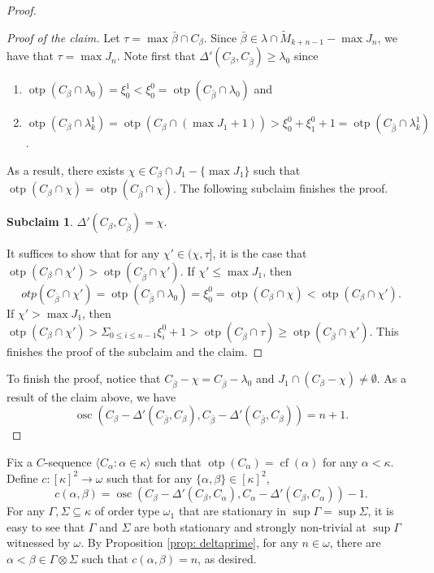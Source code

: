 \documentclass[12pt]{amsart}
\theoremstyle{definition}
\newtheorem{subclaim}[definition]{Subclaim}
\theoremstyle{plain}
\theoremstyle{plain}
\DeclareMathOperator{\cf}{cf}
\DeclareMathOperator{\otp}{otp}
\DeclareMathOperator{\osc}{osc}
\begin{document}
\begin{proof}
	\begin{proof}[Proof of the claim]
	Let $\tau = \max \bar{\beta}\cap C_\beta$. Since $\bar{\beta}\in \lambda\cap \tilde{M}_{k+n-1}-\max J_n$, we have that $\tau = \max J_n$.
	Note first that $\Delta'(C_{\beta}, C_{\bar{\beta}})\geq \lambda_0$ since
		\begin{enumerate}
		\item $\otp(C_\beta\cap \lambda_0) = \xi^1_0 < \xi^0_0 =\otp(C_{\bar{\beta}}\cap \lambda_0)$ and 
		\item $\otp(C_\beta\cap \lambda_k^1) = \otp(C_\beta\cap (\max J_1+1))> \xi^0_0 + \xi^0_1 +1 = \otp(C_{\bar{\beta}}\cap \lambda_k^1)$.
		\end{enumerate}
As a result, there exists $\chi\in C_\beta\cap J_1-\{\max J_1\}$ such that $\otp(C_{\beta}\cap \chi)=\otp(C_{\bar{\beta}}\cap \chi)$. The following subclaim finishes the proof.

	\begin{subclaim}
	$\Delta'(C_{\beta},C_{\bar{\beta}})=\chi$.
	\end{subclaim}
It suffices to show that for any $\chi'\in (\chi, \tau]$, it is the case that $\otp(C_\beta\cap \chi')>\otp(C_{\bar{\beta}}\cap \chi')$. If $\chi'\leq \max J_1$, then $$otp(C_{\bar{\beta}}\cap \chi')=\otp(C_{\bar{\beta}}\cap \lambda_0)=\xi^0_0 = \otp(C_{\beta}\cap \chi)<\otp(C_{\beta}\cap \chi').$$ If $\chi'>\max J_1$, then $\otp(C_\beta\cap \chi')>\Sigma_{0\leq i\leq n-1} \xi^0_{i}+1 > \otp(C_{\bar{\beta}}\cap \tau)\geq \otp(C_{\bar{\beta}}\cap \chi')$. This finishes the proof of the subclaim and the claim.
	\end{proof}
To finish the proof, notice that $C_{\bar{\beta}}-\chi = C_{\bar{\beta}}-\lambda_0$ and $J_1\cap (C_{\beta}-\chi)\neq \emptyset$. As a result of the claim above, we have $$\osc(C_{\beta}-\Delta'(C_{\bar{\beta}}, C_{\beta}),C_{\bar{\beta}}-\Delta'(C_{\bar{\beta}}, C_{\beta}))=n+1.$$
\end{proof} 
	
	
Fix a $C$-sequence $\langle C_\alpha: \alpha\in \kappa\rangle$ such that $\otp(C_\alpha)=\cf(\alpha)$ for any $\alpha<\kappa$. Define $c: [\kappa]^2\to \omega$ such that for any $\{\alpha,\beta\}\in [\kappa]^2$, $$c(\alpha,\beta)= \osc(C_\beta-\Delta'(C_\beta,C_\alpha), C_\alpha-\Delta'(C_\beta,C_\alpha))-1.$$
For any $\Gamma, \Sigma\subseteq \kappa$ of order type $\omega_1$ that are stationary in $\sup \Gamma =\sup \Sigma$, it is easy to see that $\Gamma$ and $\Sigma$ are both stationary and strongly non-trivial at $\sup \Gamma$ witnessed by $\omega$. By Proposition \ref{prop: deltaprime}, for any $n\in \omega$, there are $\alpha<\beta\in \Gamma\otimes \Sigma$ such that $c(\alpha,\beta)=n$, as desired.
\end{document}
